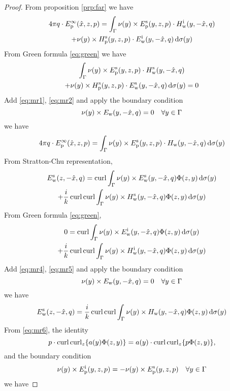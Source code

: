 \begin{proof}
  From proposition \eqref{prp:far} we have
  \begin{multline}\label{eq:mr1}
    4\pi q\cdot E_\text{p}^\infty(\hat{x}, z, p) = \int_{\Gamma}\nu(y)\times E_\text{p}^\text{s}(y, z, p)\cdot H_\text{w}^\text{i}(y, -\hat{x}, q) \\+ \nu(y)\times H_\text{p}^\text{s}(y, z, p)\cdot E_\text{w}^\text{i}(y, -\hat{x}, q)\,\text{d}\sigma(y) 
  \end{multline}
  From Green formula \eqref{eq:green} we have
  \begin{multline}\label{eq:mr2}
    \int_{\Gamma}\nu(y)\times E_\text{p}^\text{s}(y, z, p)\cdot H_\text{w}^\text{s}(y, -\hat{x}, q) \\+ \nu(y)\times H_\text{p}^\text{s}(y, z, p)\cdot E_\text{w}^\text{s}(y, -\hat{x}, q)\,\text{d}\sigma(y) = 0 
  \end{multline}
  Add \eqref{eq:mr1}, \eqref{eq:mr2} and apply the boundary condition $$\nu(y)\times E_\text{w}(y, -\hat{x}, q)=0\quad\forall y\in\Gamma$$ we have
  \begin{align}\label{eq:mr3}
    4\pi q\cdot E_\text{p}^\infty(\hat{x}, z, p)= \int_{\Gamma}\nu(y)\times E_\text{p}^\text{s}(y, z, p)\cdot H_\text{w}(y, -\hat{x}, q)\,\text{d}\sigma(y) 
  \end{align}
  From Stratton-Chu representation,  
  \begin{multline}\label{eq:mr4}
    E_\text{w}^\text{s}(z, -\hat{x}, q) = \operatorname{curl}\int_{\Gamma}\nu(y)\times E_\text{w}^\text{s}(y, -\hat{x}, q)\Phi(z, y)\,\text{d}\sigma(y)\\+\frac{i}{k}\operatorname{curl}\operatorname{curl}\int_{\Gamma}\nu(y)\times H_\text{w}^\text{s}(y, -\hat{x}, q)\Phi(z, y)\,\text{d}\sigma(y)
  \end{multline}
  From Green formula \eqref{eq:green},
  \begin{multline}\label{eq:mr5}
    0 = \operatorname{curl}\int_{\Gamma}\nu(y)\times E_\text{w}^\text{i}(y, -\hat{x}, q)\Phi(z, y)\,\text{d}\sigma(y)\\+\frac{i}{k}\operatorname{curl}\operatorname{curl}\int_{\Gamma}\nu(y)\times H_\text{w}^\text{i}(y, -\hat{x}, q)\Phi(z, y)\,\text{d}\sigma(y)
  \end{multline}
  Add \eqref{eq:mr4}, \eqref{eq:mr5} and apply the boundary condition $$\nu(y)\times E_\text{w}(y, -\hat{x}, q)=0\quad\forall y\in\Gamma$$ we have
  \begin{align}\label{eq:mr6}
    E_\text{w}^\text{s}(z, -\hat{x}, q) = \frac{i}{k}\operatorname{curl}\operatorname{curl}\int_{\Gamma}\nu(y)\times H_\text{w}(y, -\hat{x}, q)\Phi(z, y)\,\text{d}\sigma(y)
  \end{align}
  From \eqref{eq:mr6}, the identity $$p\cdot\operatorname{curl}\operatorname{curl}_z\{a(y)\Phi(z, y)\}=a(y)\cdot\operatorname{curl}\operatorname{curl}_z\{p\Phi(z, y)\},$$ and the boundary condition $$\nu(y)\times E_\text{p}^\text{i}(y, z, p) = -\nu(y)\times E_\text{p}^\text{s}(y, z, p)\quad\forall y\in\Gamma$$ we have 

\end{proof}
